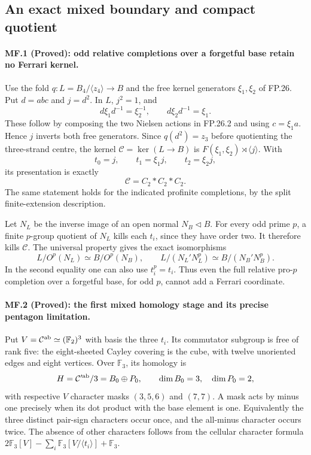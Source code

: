 \subsection{An exact mixed boundary and compact quotient}

\paragraph{MF.1 (Proved): odd relative completions over a forgetful
base retain no Ferrari kernel.}
Use the fold $q:L=B_4/\langle z_4\rangle\to B$ and the
free kernel generators $\xi_1,\xi_2$ of FP.26. Put
$d=abc$ and $j=d^2$. In $L$, $j^2=1$, and
\[
 d\xi_1d^{-1}=\xi_2^{-1},\qquad
 d\xi_2d^{-1}=\xi_1.
\]
These follow by composing the two Nielsen actions in
FP.26.2 and using $c=\xi_1a$. Hence $j$ inverts both
free generators. Since $q(d^2)=z_3$ before quotienting the
three-strand centre, the kernel $\mathcal C=\ker(L\to B)$
is $F(\xi_1,\xi_2)\rtimes\langle j\rangle$.
With
\[
       t_0=j,\qquad t_1=\xi_1j,\qquad t_2=\xi_2j,
\]
its presentation is exactly
\[
               \mathcal C=C_2*C_2*C_2.
\]
The same statement holds for the indicated profinite
completions, by the split finite-extension description.

Let $N_L$ be the inverse image of an open normal
$N_B\triangleleft B$. For every odd prime $p$, a finite
$p$-group quotient of $N_L$ kills each $t_i$, since they
have order two. It therefore kills $\mathcal C$.
The universal property gives the exact isomorphisms
\[
 L/O^p(N_L)\simeq B/O^p(N_B),\qquad
 L/(N_L'N_L^p)\simeq B/(N_B'N_B^p).
\]
In the second equality one can also use $t_i^p=t_i$.
Thus even the full relative pro-$p$ completion over a
forgetful base, for odd $p$, cannot add a Ferrari coordinate.

\paragraph{MF.2 (Proved): the first mixed homology stage and its
precise pentagon limitation.}
Put $V=\mathcal C^{\rm ab}\simeq(\mathbb F_2)^3$ with
basis the three $t_i$. Its commutator subgroup is free of
rank five: the eight-sheeted Cayley covering is the cube,
with twelve unoriented edges and eight vertices.
Over $\mathbb F_3$, its homology is
\[
 H=\mathcal C'^{\rm ab}/3
   =B_0\oplus P_0,
 \qquad\dim B_0=3,\quad\dim P_0=2,
\]
with respective $V$ character masks
$(3,5,6)$ and $(7,7)$. A mask acts by minus one precisely
when its dot product with the base element is one.
Equivalently the three distinct pair-sign characters occur
once, and the all-minus character occurs twice.
The absence of other characters follows from the cellular
character formula
$2\mathbb F_3[V]-\sum_i\mathbb F_3[V/\langle t_i\rangle]
 +\mathbb F_3$.

